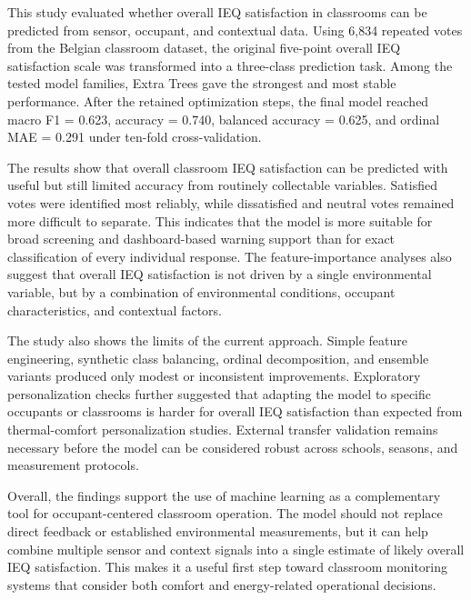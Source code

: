 ﻿\documentclass[11pt]{article}
\newcommand{\Reviewed}[1]{\begingroup\color{black}#1\endgroup}
\begin{document}
\Reviewed{This study evaluated whether overall IEQ satisfaction in classrooms can be predicted from sensor, occupant, and contextual data. Using 6{,}834 repeated votes from the Belgian classroom dataset, the original five-point overall IEQ satisfaction scale was transformed into a three-class prediction task. Among the tested model families, Extra Trees gave the strongest and most stable performance. After the retained optimization steps, the final model reached macro F1 = 0.623, accuracy = 0.740, balanced accuracy = 0.625, and ordinal MAE = 0.291 under ten-fold cross-validation.

The results show that overall classroom IEQ satisfaction can be predicted with useful but still limited accuracy from routinely collectable variables. Satisfied votes were identified most reliably, while dissatisfied and neutral votes remained more difficult to separate. This indicates that the model is more suitable for broad screening and dashboard-based warning support than for exact classification of every individual response. The feature-importance analyses also suggest that overall IEQ satisfaction is not driven by a single environmental variable, but by a combination of environmental conditions, occupant characteristics, and contextual factors.

The study also shows the limits of the current approach. Simple feature engineering, synthetic class balancing, ordinal decomposition, and ensemble variants produced only modest or inconsistent improvements. Exploratory personalization checks further suggested that adapting the model to specific occupants or classrooms is harder for overall IEQ satisfaction than expected from thermal-comfort personalization studies. External transfer validation remains necessary before the model can be considered robust across schools, seasons, and measurement protocols.

Overall, the findings support the use of machine learning as a complementary tool for occupant-centered classroom operation. The model should not replace direct feedback or established environmental measurements, but it can help combine multiple sensor and context signals into a single estimate of likely overall IEQ satisfaction. This makes it a useful first step toward classroom monitoring systems that consider both comfort and energy-related operational decisions.}

\begingroup\sloppy\printbibliography[heading=bibnumbered,title={References}]\endgroup
\end{document}
